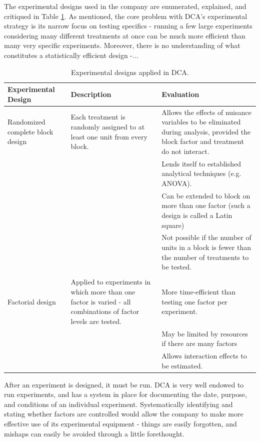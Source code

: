\documentclass[11pt,a4paper,article]{memoir} %
\begin{document}
\par
The experimental designs used in the company are enumerated, explained, and critiqued in Table \ref{tab:exp_designs}. As mentioned, the core problem with DCA's experimental strategy is its narrow focus on testing specifics - running a few large experiments considering many different treatments at once can be much more efficient than many very specific experiments. Moreover, there is no understanding of what constitutes a statistically efficient design -...
\renewcommand\arraystretch{1.5}
\begin{table}[H]
\hspace*{-2.25cm}
\small
\centering
	\begin{tabular}{p{3.5cm} p{6cm} p{6.5cm}}
	\toprule
	\textbf{Experimental Design} 		& 	\textbf{Description}	&	\textbf{Evaluation} \\\toprule
	Randomized complete block design	 & 	Each treatment is randomly assigned to at least one unit from every block. &  Allows the effects of nuisance variables to be eliminated during analysis, provided the block factor and treatment do not interact. \\
	& & Lends itself to established analytical techniques (e.g. ANOVA). \\
	& & Can be extended to block on more than one factor (such a design is called a Latin square) \\
	& & Not possible if the number of units in a block is fewer than the number of treatments to be tested. \\
	&&\\
	Factorial design & Applied to experiments in which more than one factor is varied - all combinations of factor levels are tested. & More time-efficient than testing one factor per experiment. \\
	& &  May be limited by resources if there are many factors \\
	& & Allows interaction effects to be estimated.
	\\\bottomrule
	\end{tabular}
	\hspace*{-2.25cm}
	\caption{Experimental designs applied in DCA.}
	\label{tab:exp_designs}
\end{table}

After an experiment is designed, it must be run. DCA is very well endowed to run experiments, and has a system in place for documenting the date, purpose, and conditions of an individual experiment. Systematically identifying and stating whether factors are controlled would allow the company to make more effective use of its experimental equipment - things are easily forgotten, and mishaps can easily be avoided through a little forethought. 
\end{document}
